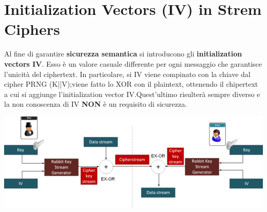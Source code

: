 \documentclass{book}
\theoremstyle{remark}
\begin{document}
\chapter{Initialization Vectors (IV) in Strem Ciphers}
Al fine di garantire \textbf{sicurezza semantica} si introducono gli \textbf{initialization vectors IV}\@. Esso è un valore casuale differente per ogni messaggio che garantisce l'unicità del ciphertext\@.\newline
In particolare, si IV viene compinato con la chiave dal cipher PRNG (K||V);\@ne viene fatto lo XOR con il plaintext, ottenendo il chipertext a cui si aggiunge l'initialization vector IV\@.Quest'ultimo risulterà sempre diverso e la non conoscenza di IV \textbf{NON} è un requisito di sicurezza\@.
\begin{center}
	\includegraphics[scale= 0.35]{IVStreamCipher.png}
\end{center}
\end{document}

